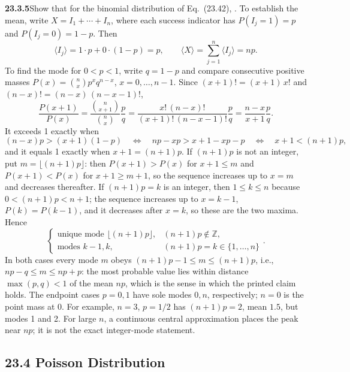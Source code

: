 \par\bigskip
\noindent\textbf{23.3.5}\quad Show that for the binomial
distribution of Eq.~(23.42), .
\solution
{}
To establish the mean, write $X=I_1+\cdots+I_n$, where each success
indicator has $P(I_j=1)=p$ and $P(I_j=0)=1-p$. Then
\[
 \langle I_j\rangle=1\cdot p+0\cdot(1-p)=p,\qquad
 \boxed{\langle X\rangle=\sum_{j=1}^n\langle I_j\rangle=np}.
\]
To find the mode for $0<p<1$, write $q=1-p$ and compare consecutive
positive masses $P(x)=\binom nxp^xq^{n-x}$, $x=0,\ldots,n-1$. Since
$(x+1)!=(x+1)\,x!$ and $(n-x)!=(n-x)\,(n-x-1)!$,
\[
\frac{P(x+1)}{P(x)}=\frac{\binom n{x+1}}{\binom nx}\frac pq
=\frac{x!\,(n-x)!}{(x+1)!\,(n-x-1)!}\frac pq
=\frac{n-x}{x+1}\frac pq.
\]
It exceeds 1 exactly when
\[
(n-x)p>(x+1)(1-p)
\quad\Longleftrightarrow\quad np-xp>x+1-xp-p
\quad\Longleftrightarrow\quad x+1<(n+1)p,
\]
and it equals 1 exactly when $x+1=(n+1)p$.
If $(n+1)p$ is not an integer, put $m=\lfloor(n+1)p\rfloor$: then
$P(x+1)>P(x)$ for $x+1\le m$ and $P(x+1)<P(x)$ for $x+1\ge m+1$, so the
sequence increases up to $x=m$ and decreases thereafter. If
$(n+1)p=k$ is an integer, then $1\le k\le n$ because
$0<(n+1)p<n+1$; the sequence increases up to $x=k-1$, $P(k)=P(k-1)$,
and it decreases after $x=k$, so these are the two maxima. Hence
\[
\boxed{\begin{cases}
\text{unique mode }\lfloor(n+1)p\rfloor,&(n+1)p\notin\mathbb Z,\\
\text{modes }k-1,k,&(n+1)p=k\in\{1,\ldots,n\}
\end{cases}}.
\]
In both cases every mode $m$ obeys $(n+1)p-1\le m\le(n+1)p$, i.e.,
$np-q\le m\le np+p$: the most probable value lies within distance
$\max(p,q)<1$ of the mean $np$, which is the sense in which the printed
claim holds. The endpoint cases $p=0,1$ have sole modes $0,n$,
respectively; $n=0$ is the point mass at 0. For example, $n=3$,
$p=1/2$ has $(n+1)p=2$, mean $1.5$, but modes 1 and 2. For large $n$, a
continuous central approximation places the peak near $np$; it is not
the exact integer-mode statement.


\subsection*{23.4 Poisson Distribution}

